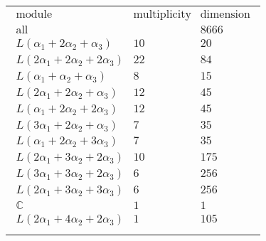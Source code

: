 \documentclass[crop,border=2mm]{standalone}
\begin{document}
\begin{tabular}{l}
$\displaystyle
\begin{array}{rll}
	\text{module}&\text{multiplicity}&\text{dimension} \\ \hline \text{all}&&8666 \\
	L\left(\alpha_{1}+ 2\alpha_{2}+\alpha_{3}\right)&10&20\\
	L\left( 2\alpha_{1}+ 2\alpha_{2}+ 2\alpha_{3}\right)&22&84\\
	L\left(\alpha_{1}+\alpha_{2}+\alpha_{3}\right)&8&15\\
	L\left( 2\alpha_{1}+ 2\alpha_{2}+\alpha_{3}\right)&12&45\\
	L\left(\alpha_{1}+ 2\alpha_{2}+ 2\alpha_{3}\right)&12&45\\
	L\left( 3\alpha_{1}+ 2\alpha_{2}+\alpha_{3}\right)&7&35\\
	L\left(\alpha_{1}+ 2\alpha_{2}+ 3\alpha_{3}\right)&7&35\\
	L\left( 2\alpha_{1}+ 3\alpha_{2}+ 2\alpha_{3}\right)&10&175\\
	L\left( 3\alpha_{1}+ 3\alpha_{2}+ 2\alpha_{3}\right)&6&256\\
	L\left( 2\alpha_{1}+ 3\alpha_{2}+ 3\alpha_{3}\right)&6&256\\
	\mathbb{C}&1&1\\
	L\left( 2\alpha_{1}+ 4\alpha_{2}+ 2\alpha_{3}\right)&1&105
\end{array}
$ \\ \\

\end{tabular}
\end{document}
